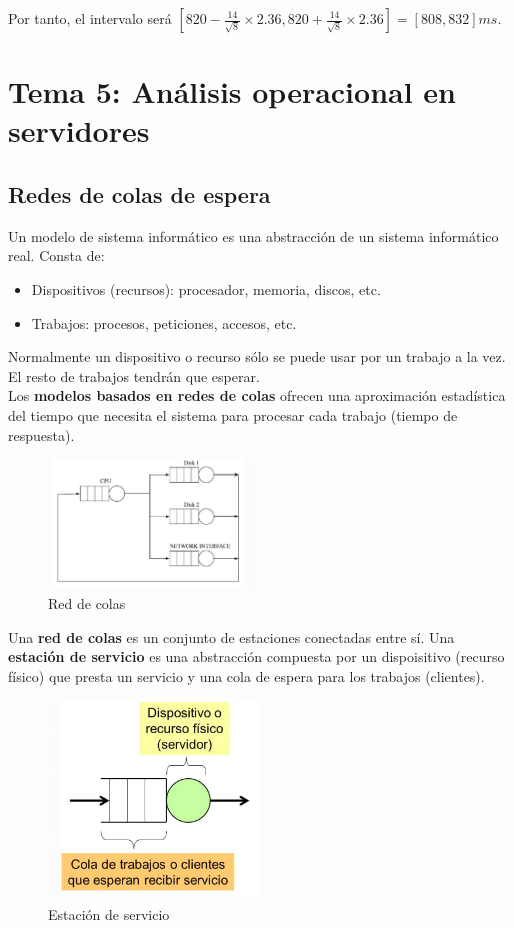 \documentclass[12pt,spanish]{article}
\begin{document}
Por tanto, el intervalo será $	[820-\frac{14}{\sqrt{8}} \times 2.36, 820+\frac{14}{\sqrt{8}} \times 2.36] = [808,832]ms$.

\section{Tema 5: Análisis operacional en servidores}

\subsection{Redes de colas de espera}

Un modelo de sistema informático es una abstracción de un sistema informático real. Consta de:
\begin{itemize}
	\item Dispositivos (recursos): procesador, memoria, discos, etc.
	\item Trabajos: procesos, peticiones, accesos, etc.
\end{itemize}

Normalmente un dispositivo o recurso sólo se puede usar por un trabajo a la vez. El resto de trabajos tendrán que esperar.\\

Los \textbf{modelos basados en redes de colas} ofrecen una aproximación estadística del tiempo que necesita el sistema para procesar cada trabajo (tiempo de respuesta).

\begin{figure}[H]
	\centering
	\includegraphics[width=0.5\textwidth]{redcolas.png}
	\caption{Red de colas}
\end{figure}

Una \textbf{red de colas} es un conjunto de estaciones conectadas entre sí. Una \textbf{estación de servicio} es una abstracción compuesta por un dispoisitivo (recurso físico) que presta un servicio y una cola de espera para los trabajos (clientes).

\begin{figure}[H]
	\centering
	\includegraphics[width=0.5\textwidth]{estserv.png}
	\caption{Estación de servicio}
\end{figure}
\end{document}
